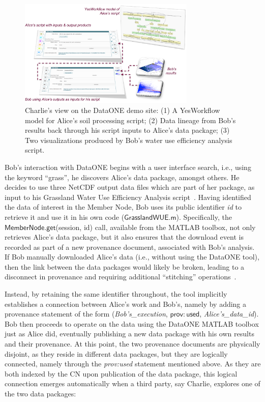 \documentclass[a4paper]{llncs}
\newcommand{\code}[1]{\ensuremath{\mathsf{#1}}}
\begin{document}
\begin{figure}[h]
\centering   
\includegraphics[width=0.75\textwidth]{figs/abc-crop}
\caption{Charlie's view on the DataONE demo site: (1) A YesWorkflow model for Alice's soil processing script; (2) Data lineage from Bob's results back through his script inputs to Alice's data package; (3) Two visualizations produced by Bob's water use efficiency analysis script.}
\label{fig2}
\end{figure}


Bob's interaction with DataONE begins with a user interface search, i.e., using the keyword ``grass'', he discovers Alice's data package, amongst others.  He decides to use three NetCDF output data files which are part of her package, as input to his Grassland Water Use Efficiency Analysis script~\cite{MsTMIP-model-output-data-set}.  Having identified the data of interest in the Member Node, Bob uses its public identifier \textit{id} to retrieve it and use it in his own code (\code{GrasslandWUE.m}).  Specifically, the \code{MemberNode.get}(session, id) call, available from the MATLAB toolbox, not only retrieves Alice's data package, but it also ensures that the download event is recorded as part of a new provenance document, associated with Bob's analysis.
%
If Bob manually downloaded Alice's data (i.e., without using the DataONE tool), then the link between the data packages would likely be broken, leading to a disconnect in provenance and requiring additional ``stitching'' operations~\cite{missing-link}.


Instead, by retaining the same identifier throughout, the tool implicitly establishes a connection between Alice's work and Bob's, namely by adding a provenance statement of the form (\emph{{Bob's\_execution}}, \code{prov{:}used}, {\emph{Alice's\_data\_id}}). Bob then proceeds to operate on the data using the DataONE MATLAB toolbox just as Alice did, eventually publishing a new data package with his own results and their provenance.  At this point, the two provenance documents are physically disjoint, as they reside in different data packages, but they are logically connected, namely through the \emph{prov:used} statement mentioned above.  As they are both indexed by the CN upon publication of the data package, this logical connection emerges automatically when a third party, say Charlie, explores one of the two data packages:
\end{document}
